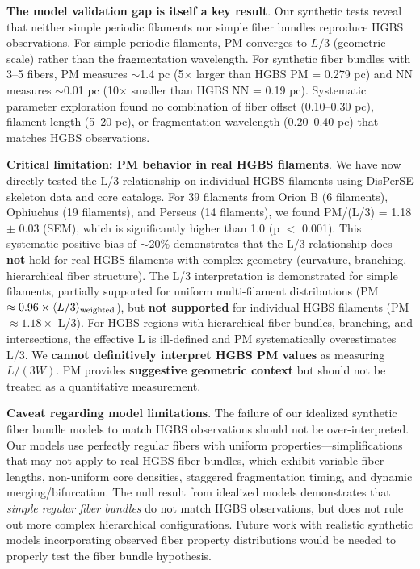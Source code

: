 \documentclass[twoside,twocolumn]{mnras}
\begin{document}
\textbf{The model validation gap is itself a key result}. Our synthetic tests reveal that neither simple periodic filaments nor simple fiber bundles reproduce HGBS observations. For simple periodic filaments, PM converges to $L/3$ (geometric scale) rather than the fragmentation wavelength. For synthetic fiber bundles with 3--5 fibers, PM measures $\sim$1.4 pc (5$\times$ larger than HGBS PM = 0.279 pc) and NN measures $\sim$0.01 pc (10$\times$ smaller than HGBS NN = 0.19 pc). Systematic parameter exploration found no combination of fiber offset (0.10--0.30 pc), filament length (5--20 pc), or fragmentation wavelength (0.20--0.40 pc) that matches HGBS observations.

\textbf{Critical limitation: PM behavior in real HGBS filaments}. We have now directly tested the L/3 relationship on individual HGBS filaments using DisPerSE skeleton data and core catalogs. For 39 filaments from Orion B (6 filaments), Ophiuchus (19 filaments), and Perseus (14 filaments), we found PM/(L/3) = 1.18 $\pm$ 0.03 (SEM), which is significantly higher than 1.0 (p $<$ 0.001). This systematic positive bias of $\sim$20\% demonstrates that the L/3 relationship does \textbf{not} hold for real HGBS filaments with complex geometry (curvature, branching, hierarchical fiber structure). The L/3 interpretation is demonstrated for simple filaments, partially supported for uniform multi-filament distributions (PM $\approx 0.96 \times \langle L/3 \rangle_{\rm weighted}$), but \textbf{not supported} for individual HGBS filaments (PM $\approx 1.18 \times$ L/3). For HGBS regions with hierarchical fiber bundles, branching, and intersections, the effective L is ill-defined and PM systematically overestimates L/3. We \textbf{cannot definitively interpret HGBS PM values} as measuring $L/(3W)$. PM provides \textbf{suggestive geometric context} but should not be treated as a quantitative measurement.

\textbf{Caveat regarding model limitations}. The failure of our idealized synthetic fiber bundle models to match HGBS observations should not be over-interpreted. Our models use perfectly regular fibers with uniform properties---simplifications that may not apply to real HGBS fiber bundles, which exhibit variable fiber lengths, non-uniform core densities, staggered fragmentation timing, and dynamic merging/bifurcation. The null result from idealized models demonstrates that \textit{simple regular fiber bundles} do not match HGBS observations, but does not rule out more complex hierarchical configurations. Future work with realistic synthetic models incorporating observed fiber property distributions would be needed to properly test the fiber bundle hypothesis.
\end{document}
